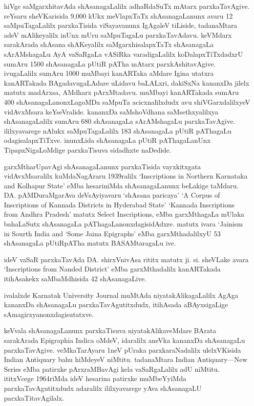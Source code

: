 \documentclass[11pt,a4size]{article}
\begin{document}
hiVge saMgarxhitavAda shAsanagaLalilx adhaRdaSuTx mAtarx
parxkaTavAgive. reYsaru sheVKarisida 9,000 kUkx meVlapxTaTx
shAsanagaLanunx avaru 12 saMpuTagaLalilx parxkaTisida viSayavanunx
IgAgaleV tiLiside, tadanaMtara adeV mAlikeyalilx inUnx mUru
saMpuTagaLu parxkaTavAdavu. keVMdarx sarakArada shAsana shAKeyalilx
saMgarxhisalapxTaTx shAsanagaLa sArAMshagaLu AyA vaSaRgaLa vASiRka
varadigaLalilx koDalapxTiTxdadxrU sumAru 1500 shAsanagaLa pUtiR pATha
mAtarx parxkAshitavAgive. ivugaLalilx sumAru 1000 muMbayi kanARTaka
aMdare Igina utatxra kanARTakada BAgadavugaLAdare uLidavu baLALxri,
dakiSxNa kananxDa jilelx matutx madArxsa, AMdharx pArxMtadavu. muMbayi
kanARTakada sumAru 400 shAsanagaLanonxLagoMDa saMpuTa acicxnalilxdudx
avu shiVGarxdalilxyeV vidAvxMsara keYseVralide. kananxDa saMshoVdhana
saMsethxyalilxya shAsanagaLalilx sumAru 680 shAsanagaLa sArAMshagaLu
parxkaTavAgive. ililxyavarege nAlukx saMpuTagaLalilx 183 shAsanagaLa
pUtiR pAThagaLu odagisalapxTiTxve. inunxLida shAsanagaLa pUtiR
pAThagaLanUnx TipapxNigaLoMdige parxkaTisuva sidadhxte naDedide.

garxMtharUpavAgi shAsanagaLanunx parxkaTisida vayxkitxgata
vidAvxMsaralilx kuMdaNagAraru 1939ralilx {\rm
    `Inscriptions in Northern Karnataka and Kolhapur State'} eMba
hesariniMda shAsanagaLanunx beLakige taMdaru. DA. pAMDuraMgarAva
deVsAyiyavaru `shAsana paricaya' {\rm `A Corpus of
    Inscriptions of Kannada Districts in Hyderabad State' `Kannada
    Inscriptions from Andhra Pradesh'} matutx {\rm
    Select Inscriptions,} eMba garxMthagaLa mUlaka bahaLaSutx
shAsanagaLa pAThagaLanonxdagisidAdxre. matutx ivara {\rm
    `Jainism in Sourth India and `Some Jaina Epigraphs'} eMba
garxMthadalilxyU 53 shAsanagaLa pUtiRpATha matutx BASAMtaragaLu ive.

ideV vaSaR parxkaTavAda DA. shirxVnivAsa rititx matutx
ji. si. sheVLake avara {\rm `Inscriptions from Nanded District'} eMba
garxMthadalilx kanARTakada itihAsakekx saMbaMdhisida 42 shAsanagaLive.

ivalalxde {\rm Karnatak University Journal} muMtAda
niyatakAlikagaLalilx AgAga kananxDa shAsanagaLu parxkaTavAgutitxdudx,
itihAsada aBAyxsigaLige sAmagirxyanonxdagisutatxve.

keVvala shAsanagaLanunx parxkaTisuva niyatakAlikaveMdare BArata
sarakArada {\rm Epigraphia Indica} oMdeV, idaralilx aneVka kananxDa
shAsanagaLu parxkaTavAgive. veMkaTarAyaru 1neV pUraka parxkaraNadalilx
ulelxVKisida {\rm Indian Antiquary} bahu hiMdeyeV niMtitu. tadanaMtara
{\rm Indian Antiquary---New Series} eMba patirxke pArxraMBavAgi kela
vaSaRgaLalilx adU niMtitu. ititxVcege 1964riMda ideV hesarina patirxke
muMbeYyiMda parxkaTavAgutitxdudx adaralilx ililxyavarege yAva
shAsanagaLU parxkaTitavAgilalx.
\end{document}
